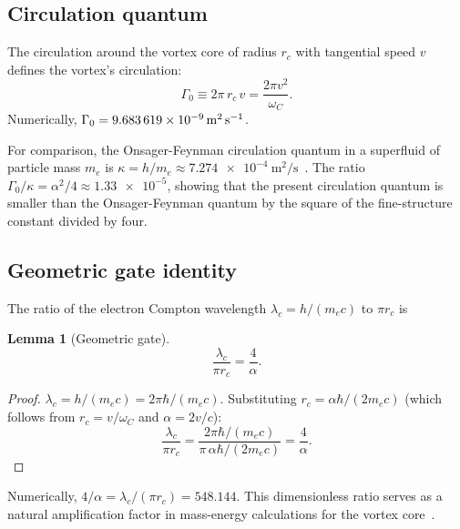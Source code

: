\documentclass[aps,pra,preprint,longbibliography,nofootinbib]{revtex4-2}
\newtheorem{lemma}{Lemma}
\newcommand{\vc}{v}              %
\newcommand{\rc}{r_c}            %
\newcommand{\omC}{\omega_C}      %
\newcommand{\lc}{\lambda_c}      %
\newcommand{\Gz}{\Gamma_0}       %
\begin{document}
\subsection{Circulation quantum}
\label{sec:Gamma0}

The circulation around the vortex core of radius $\rc$ with tangential
speed $\vc$ defines the vortex's circulation:
\begin{equation}
  \Gz \equiv 2\pi\,\rc\,\vc = \frac{2\pi\vc^2}{\omC}.
  \label{eq:Gamma0}
\end{equation}
Numerically, $\Gz = \SI{9.683\,619e-9}{\meter\squared\per\second}$.

For comparison, the Onsager-Feynman circulation quantum in a
superfluid of particle mass $m_e$ is
$\kappa = h/m_e \approx \SI{7.274e-4}{\meter\squared\per\second}$~\cite{Onsager1949,Feynman1955}.
The ratio $\Gz/\kappa = \alpha^2/4 \approx \num{1.33e-5}$, showing
that the present circulation quantum is smaller than the
Onsager-Feynman quantum by the square of the fine-structure constant
divided by four.

\subsection{Geometric gate identity}
\label{sec:gate}

The ratio of the electron Compton wavelength $\lc = h/(m_e c)$ to
$\pi\rc$ is

\begin{lemma}[Geometric gate]
\label{lem:gate}
\begin{equation}
  \frac{\lc}{\pi\rc} = \frac{4}{\alpha}.
  \label{eq:gate}
\end{equation}
\end{lemma}

\begin{proof}
$\lc = h/(m_e c) = 2\pi\hbar/(m_e c)$.
Substituting $\rc = \alpha\hbar/(2m_e c)$ (which follows from $\rc = \vc/\omC$
and $\alpha = 2\vc/c$):
\begin{equation}
  \frac{\lc}{\pi\rc}
  = \frac{2\pi\hbar/(m_e c)}{\pi\,\alpha\hbar/(2m_e c)}
  = \frac{4}{\alpha}.
\end{equation}
\end{proof}

Numerically, $4/\alpha = \lc/(\pi\rc) = \num{548.144}$.
This dimensionless ratio serves as a natural amplification factor in
mass-energy calculations for the vortex core~\cite{CantarellaKusner2002}.
\end{document}
